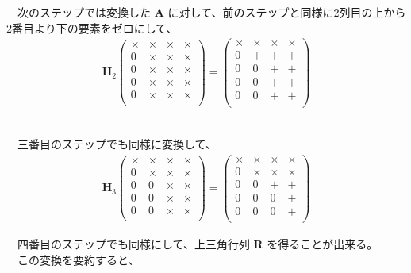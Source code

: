 \documentclass[dvipdfmx,10pt,presentation]{beamer}
\begin{document}
\begin{enumerate}
　次のステップでは変換した \(\bm{A}\) に対して、前のステップと同様に2列目の上から2番目より下の要素をゼロにして、\\

\begin{align*}
\bm{H}_2
\begin{pmatrix}
\times & \times & \times & \times \\
0 & \times & \times & \times \\
0 & \times & \times & \times \\
0 & \times & \times & \times \\
0 & \times & \times & \times \\
\end{pmatrix}
=
\begin{pmatrix}
\times & \times & \times & \times \\
0 & + & + & + \\
0 & 0 & + & + \\
0 & 0 & + & + \\
0 & 0 & + & + \\
\end{pmatrix}
\end{align*}


\framebreak\\
　三番目のステップでも同様に変換して、\\

\begin{align*}
\bm{H}_3
\begin{pmatrix}
\times & \times & \times & \times \\
0 & \times & \times & \times \\
0 & 0 & \times & \times \\
0 & 0 & \times & \times \\
0 & 0 & \times & \times \\
\end{pmatrix}
=
\begin{pmatrix}
\times & \times & \times & \times \\
0 & \times & \times & \times \\
0 & 0 & + & + \\
0 & 0 & 0 & + \\
0 & 0 & 0 & + \\
\end{pmatrix}
\end{align*}

　四番目のステップでも同様にして、上三角行列 \(\bm{R}\) を得ることが出来る。\\
　この変換を要約すると、\\


\end{enumerate}
\end{document}
